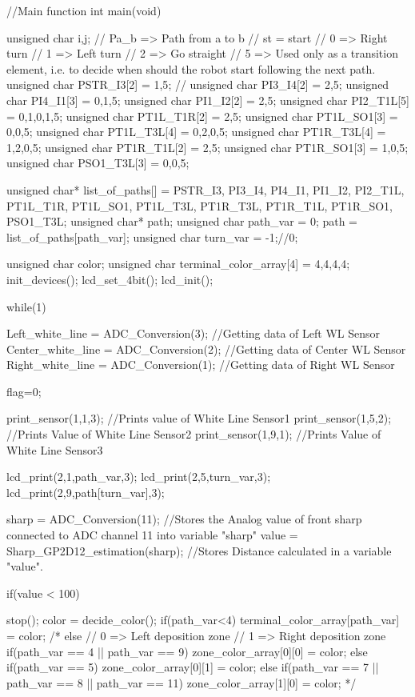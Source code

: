 //Main function
int main(void)
{
 unsigned char i,j;
 // Pa_b => Path from a to b
 // st = start
 // 0 => Right turn
 // 1 => Left turn
 // 2 => Go straight
 // 5 => Used only as a transition element, i.e. to decide when should the robot start following the next path.
 unsigned char PSTR_I3[2] = {1,5}; // 
 unsigned char PI3_I4[2] = {2,5};
 unsigned char PI4_I1[3] = {0,1,5};
 unsigned char PI1_I2[2] = {2,5};
 unsigned char PI2_T1L[5] = {0,1,0,1,5};
 unsigned char PT1L_T1R[2] = {2,5};
 unsigned char PT1L_SO1[3] = {0,0,5};
 unsigned char PT1L_T3L[4] = {0,2,0,5};
 unsigned char PT1R_T3L[4] = {1,2,0,5};
 unsigned char PT1R_T1L[2] = {2,5};
 unsigned char PT1R_SO1[3] = {1,0,5};
 unsigned char PSO1_T3L[3] = {0,0,5};
 
 unsigned char* list_of_paths[] = {PSTR_I3, PI3_I4, PI4_I1, PI1_I2, PI2_T1L, PT1L_T1R, PT1L_SO1, PT1L_T3L, PT1R_T3L, PT1R_T1L, PT1R_SO1, PSO1_T3L};
 unsigned char* path;
 unsigned char path_var = 0;
 path = list_of_paths[path_var];
 unsigned char turn_var = -1;//0;
 
 unsigned char color;
 unsigned char terminal_color_array[4] = {4,4,4,4};
 init_devices();
 lcd_set_4bit();
 lcd_init();
 
 while(1)
 {

	 Left_white_line = ADC_Conversion(3);	//Getting data of Left WL Sensor
	 Center_white_line = ADC_Conversion(2);	//Getting data of Center WL Sensor
	 Right_white_line = ADC_Conversion(1);	//Getting data of Right WL Sensor

	 flag=0;

	 print_sensor(1,1,3);	//Prints value of White Line Sensor1
	 print_sensor(1,5,2);	//Prints Value of White Line Sensor2
	 print_sensor(1,9,1);	//Prints Value of White Line Sensor3
	 
	 lcd_print(2,1,path_var,3);
	 lcd_print(2,5,turn_var,3);
	 lcd_print(2,9,path[turn_var],3);
	 
	 sharp = ADC_Conversion(11);						//Stores the Analog value of front sharp connected to ADC channel 11 into variable "sharp"
	 value = Sharp_GP2D12_estimation(sharp);            //Stores Distance calculated in a variable "value".
	 
	 if(value < 100)				
	 {
		 stop();
		 color = decide_color();
		 if(path_var<4)
		   {
		    terminal_color_array[path_var] = color;
		   }
        /*         else
                   {
                    // 0 => Left deposition zone
                    // 1 => Right deposition zone
                    if(path_var == 4 || path_var == 9)
                      zone_color_array[0][0] = color;
                    else if(path_var == 5)
                      zone_color_array[0][1] = color;
                    else if(path_var == 7 || path_var == 8 || path_var == 11)
                      zone_color_array[1][0] = color;
		   }*/

}}}

